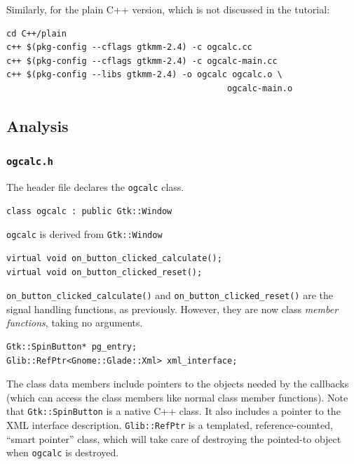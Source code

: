 \documentclass[a4paper,oneside]{article}
\newcommand{\filename}[1]{\texttt{#1}}
\newcommand{\class}[1]{\texttt{#1}}
\newcommand{\function}[1]{\texttt{#1()}}
\begin{document}
Similarly, for the plain C++ version, which is not discussed in the
tutorial:

\begin{verbatim}
cd C++/plain
c++ $(pkg-config --cflags gtkmm-2.4) -c ogcalc.cc
c++ $(pkg-config --cflags gtkmm-2.4) -c ogcalc-main.cc
c++ $(pkg-config --libs gtkmm-2.4) -o ogcalc ogcalc.o \
                                            ogcalc-main.o
\end{verbatim}

\subsection{Analysis}

\subsubsection{\filename{ogcalc.h}}

The header file declares the \class{ogcalc} class.

\begin{lstlisting}[numbers=none, language={[GNU]C++}]
class ogcalc : public Gtk::Window
\end{lstlisting}

\class{ogcalc} is derived from \class{Gtk::Window}

\begin{lstlisting}[numbers=none, language={[GNU]C++}]
virtual void on_button_clicked_calculate();
virtual void on_button_clicked_reset();
\end{lstlisting}

\function{on\_button\_clicked\_calculate} and
\function{on\_button\_clicked\_reset} are the signal handling
functions, as previously.  However, they are now class \emph{member
  functions}, taking no arguments.

\begin{lstlisting}[numbers=none, language={[GNU]C++}]
Gtk::SpinButton* pg_entry;
Glib::RefPtr<Gnome::Glade::Xml> xml_interface;
\end{lstlisting}

The class data members include pointers to the objects needed by the
callbacks (which can access the class members like normal class member
functions).  Note that \class{Gtk::SpinButton} is a native C++ class.
It also includes a pointer to the XML interface description.
\class{Glib::RefPtr} is a templated, reference-counted, ``smart
pointer'' class, which will take care of destroying the pointed-to
object when \class{ogcalc} is destroyed.
\end{document}
